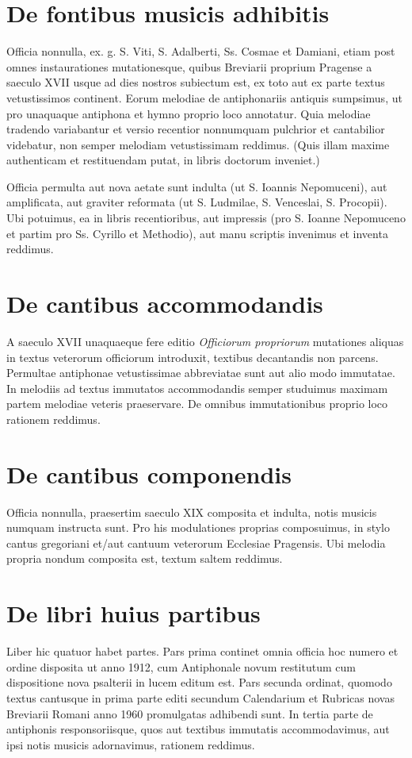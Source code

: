 \section*{De fontibus musicis adhibitis}
Officia nonnulla, ex. g. S. Viti, S. Adalberti, Ss. Cosmae et Damiani,
etiam post omnes instaurationes mutationesque, quibus
Breviarii proprium Pragense a saeculo XVII usque ad dies nostros
subiectum est, ex toto aut ex parte textus vetustissimos
continent.
Eorum melodiae de antiphonariis antiquis sumpsimus,
ut pro unaquaque antiphona et hymno proprio loco annotatur.
Quia melodiae tradendo variabantur et versio recentior nonnumquam
pulchrior et cantabilior videbatur, non semper melodiam
vetustissimam reddimus.
(Quis illam maxime authenticam et restituendam putat,
in libris doctorum inveniet.)

Officia permulta aut nova aetate sunt indulta
(ut S. Ioannis Nepomuceni),
aut amplificata,
aut graviter reformata (ut S. Ludmilae, S. Venceslai, S. Procopii).
Ubi potuimus, ea in libris recentioribus, aut impressis
(pro S. Ioanne Nepomuceno et partim pro Ss. Cyrillo et Methodio),
aut manu scriptis invenimus et inventa reddimus.

\section*{De cantibus accommodandis}
A saeculo XVII unaquaeque fere editio \emph{Officiorum propriorum}
mutationes aliquas in textus veterorum officiorum introduxit,
textibus decantandis non parcens.
Permultae antiphonae vetustissimae abbreviatae sunt aut
alio modo immutatae.
In melodiis ad textus immutatos accommodandis semper studuimus
maximam partem melodiae veteris praeservare.
De omnibus immutationibus proprio loco rationem reddimus.

\section*{De cantibus componendis}
Officia nonnulla, praesertim saeculo XIX composita et indulta,
notis musicis numquam instructa sunt.
Pro his modulationes proprias composuimus, in stylo cantus gregoriani
et/aut cantuum veterorum Ecclesiae Pragensis.
Ubi melodia propria nondum composita est, textum saltem reddimus.

\section*{De libri huius partibus}
Liber hic quatuor habet partes.
Pars prima continet omnia officia hoc numero et ordine disposita
ut anno 1912, cum Antiphonale novum restitutum
cum dispositione nova psalterii in lucem editum est.
Pars secunda ordinat, quomodo textus cantusque in prima parte
editi secundum Calendarium et Rubricas novas Breviarii Romani
anno 1960 promulgatas adhibendi sunt.
In tertia parte de antiphonis responsoriisque,
quos aut textibus immutatis accommodavimus,
aut ipsi notis musicis adornavimus, rationem reddimus.
